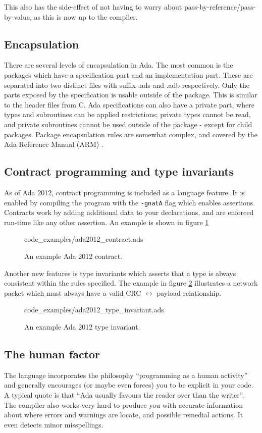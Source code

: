 \documentclass[10pt,a4paper]{article}
\def\File#1{\textsf{#1}}
\def\Code#1{\texttt{#1}}
\begin{document}
This also has the side-effect of not having to worry about pass-by-reference/pass-by-value, as this is now up to the compiler.

\subsection{Encapsulation}
There are several levels of encapsulation in Ada. The most common is the packages which have a specification part and an implementation part. These are separated into two distinct files with suffix \File{.ads} and \File{.adb} respectively. Only the parts exposed by the specification is usable outside of the package. This is similar to the header files from C.
Ada specifications can also have a private part, where types and subroutines can be applied restrictions; private types cannot be read, and private subroutines cannot be used outside of the package - except for child packages.
Package encapsulation rules are somewhat complex, and covered by the Ada Reference Manual (ARM) \cite{taft1997ada}.

\subsection{Contract programming and type invariants}
As of Ada 2012, contract programming is included as a language feature. It is enabled by compiling the program with the \Code{-gnatA} flag which enables assertions.
Contracts work by adding additional data to your declarations, and are enforced run-time like any other assertion. An example is shown in figure \ref{fig:ada2012_contract}
\begin{figure}[h]
\centering
 {code_examples/ada2012_contract.ads}
 \caption{An example Ada 2012 contract.}
 \label{fig:ada2012_contract}
\end{figure}

Another new features is type invariants which asserts that a type is always consistent within the rules specified. The example in figure \ref{fig:ada2012_type_invariant} illustrates a network packet which must always have a valid CRC $\leftrightarrow$ payload relationship.

\begin{figure}[h]
\centering
 {code_examples/ada2012_type_invariant.ads}
 \caption{An example Ada 2012 type invariant.}
 \label{fig:ada2012_type_invariant}
\end{figure}
\subsection{The human factor}
The language incorporates the philosophy ``programming as a human activity'' and generally encourages (or maybe even forces) you to be explicit in your code. A typical quote is that ``Ada usually favours the reader over than the writer''.
The compiler also works very hard to produce you with accurate information about where errors and warnings are locate, and possible remedial actions. It even detects minor misspellings.
\end{document}
